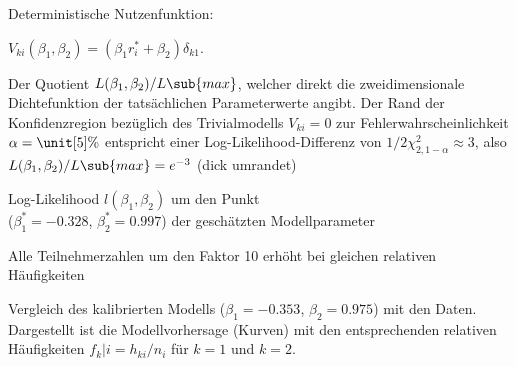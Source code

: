 \documentclass[a4paper]{foils}
\begin{document}
\begin{landscape}
\begin{center}
Deterministische Nutzenfunktion:
\vspace{1em}

$
V_{ki}(\beta_1,\beta_2) =(\beta_1r^*_i+\beta_2)\delta_{k1}.
$

\newpage
\vspace{-4em}
\vspace{-1.5em}
\parbox{1.35\textwidth}{Der Quotient
$L(\beta_1,\beta_2)/L\sub{max}$, welcher direkt die zweidimensionale
Dichtefunktion der tats\"achlichen Parameterwerte angibt. 
Der Rand der Konfidenzregion bez\"uglich des
Trivialmodells $V_{ki}=0$ zur Fehlerwahrscheinlichkeit
$\alpha=\unit[5]{\%}$ entspricht einer
Log-Likelihood-Differenz von $1/2 \chi^2_{2,1-\alpha}\approx 3$, also 
$L(\beta_1,\beta_2)/L\sub{max}=e^{-3}$ (dick umrandet)
}


\newpage
\vspace{-1em}
\vspace{-1em}

\hspace{0.1\textwidth}
\parbox{1.1\textwidth}{
Log-Likelihood $l(\beta_1,\beta_2)$ um den Punkt\\
 ($\beta_1^*=-0.328$,
  $\beta_2^*=0.997$)
 der gesch\"atzten Modell\-parameter
}

\newpage
\vspace{-1em}
\vspace{-1em}

\hspace{0.1\textwidth}
\parbox{1.1\textwidth}{
Alle Teilnehmerzahlen  um den Faktor 10
erh\"oht  bei gleichen relativen H\"aufigkeiten
}

\newpage
\vspace{0em}
\parbox{1.3\textwidth}{Vergleich des kalibrierten Modells
($\beta_1=-0.353$, $\beta_2=0.975$) 
mit den Daten. Dargestellt ist die Modellvorhersage (Kurven) mit den
entsprechenden relativen H\"aufigkeiten $f_k|i=h_{ki}/n_i$ f\"ur $k=1$
und $k=2$.
}


\end{center}
\end{landscape}
\end{document}
